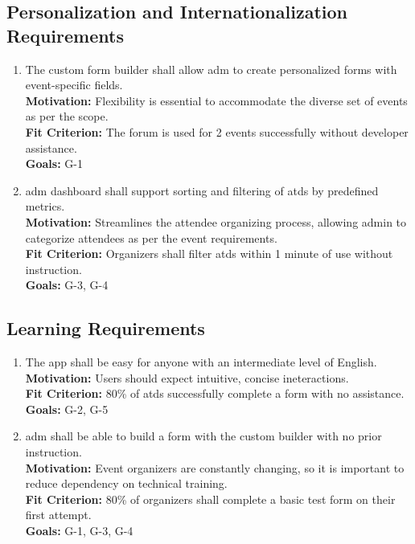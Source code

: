 \documentclass[12pt]{article}
\begin{document}
\subsection{Personalization and Internationalization Requirements}
\begin{enumerate}[label=\bfseries PI-\arabic*, wide=0pt, leftmargin=*, ref=\bfseries PI-\arabic*]
  \item \label{PI1}The custom form builder shall allow \gls{adm} to create personalized forms with event-specific fields.\\[2mm]
    {\bf Motivation:} Flexibility is essential to accommodate the diverse set of events as per the scope.\\
    {\bf Fit Criterion:} The forum is used for 2 events successfully without developer assistance.\\
    {\bf Goals:} G-1
  \item \label{PI2} \Gls{adm} dashboard shall support sorting and filtering of \glspl{atd} by predefined metrics.\\[2mm]
    {\bf Motivation:} Streamlines the attendee organizing process, allowing admin to categorize attendees as per the event requirements.\\
    {\bf Fit Criterion:} Organizers shall filter \glspl{atd} within 1 minute of use without instruction.\\
    {\bf Goals:} G-3, G-4
\end{enumerate}

\subsection{Learning Requirements}
\begin{enumerate}[label=\bfseries LR-\arabic*:, wide=0pt, leftmargin=*, ref=\bfseries LR-\arabic*]
  \item \label{LR1} The app shall be easy for anyone with an intermediate level of English.\\[2mm]
    {\bf Motivation:} Users should expect intuitive, concise ineteractions.\\
    {\bf Fit Criterion:} 80\% of \glspl{atd} successfully complete a form with no assistance.\\
    {\bf Goals:} G-2, G-5
  \item \label{LR2} \Gls{adm} shall be able to build a form with the custom builder with no prior instruction.\\[2mm]
    {\bf Motivation:} Event organizers are constantly changing, so it is important to reduce dependency on technical training.\\
    {\bf Fit Criterion:} 80\% of organizers shall complete a basic test form on their first attempt.\\
    {\bf Goals:} G-1, G-3, G-4
\end{enumerate}
\end{document}
